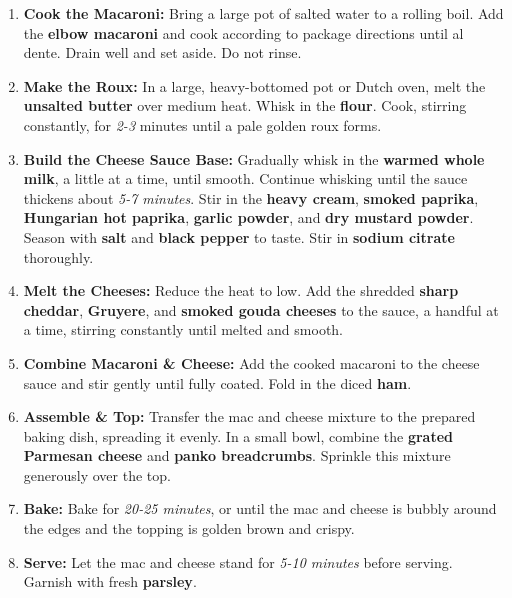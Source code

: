 \documentclass[11pt,letterpaper]{article}
\begin{document}
\begin{enumerate}
    \item \textbf{Cook the Macaroni:} Bring a large pot of salted water to a rolling boil. Add the \textbf{elbow macaroni} and cook according to package directions until al dente. Drain well and set aside. Do not rinse.
    \item \textbf{Make the Roux:} In a large, heavy-bottomed pot or Dutch oven, melt the \textbf{unsalted butter} over medium heat. Whisk in the \textbf{flour}. Cook, stirring constantly, for \textit{2-3} minutes until a pale golden roux forms.
    \item \textbf{Build the Cheese Sauce Base:} Gradually whisk in the \textbf{warmed whole milk}, a little at a time, until smooth. Continue whisking until the sauce thickens about \textit{5-7 minutes}. Stir in the \textbf{heavy cream}, \textbf{smoked paprika}, \textbf{Hungarian hot paprika}, \textbf{garlic powder}, and \textbf{dry mustard powder}. Season with \textbf{salt} and \textbf{black pepper} to taste. Stir in \textbf{sodium citrate} thoroughly.
    \item \textbf{Melt the Cheeses:} Reduce the heat to low. Add the shredded \textbf{sharp cheddar}, \textbf{Gruyere}, and \textbf{smoked gouda cheeses} to the sauce, a handful at a time, stirring constantly until melted and smooth.
    \item \textbf{Combine Macaroni \& Cheese:} Add the cooked macaroni to the cheese sauce and stir gently until fully coated. Fold in the diced \textbf{ham}.
    \item \textbf{Assemble \& Top:} Transfer the mac and cheese mixture to the prepared baking dish, spreading it evenly. In a small bowl, combine the \textbf{grated Parmesan cheese} and \textbf{panko breadcrumbs}. Sprinkle this mixture generously over the top.
    \item \textbf{Bake:} Bake for \textit{20-25 minutes}, or until the mac and cheese is bubbly around the edges and the topping is golden brown and crispy.
    \item \textbf{Serve:} Let the mac and cheese stand for \textit{5-10 minutes} before serving. Garnish with fresh \textbf{parsley}.
\end{enumerate}
\end{document}
